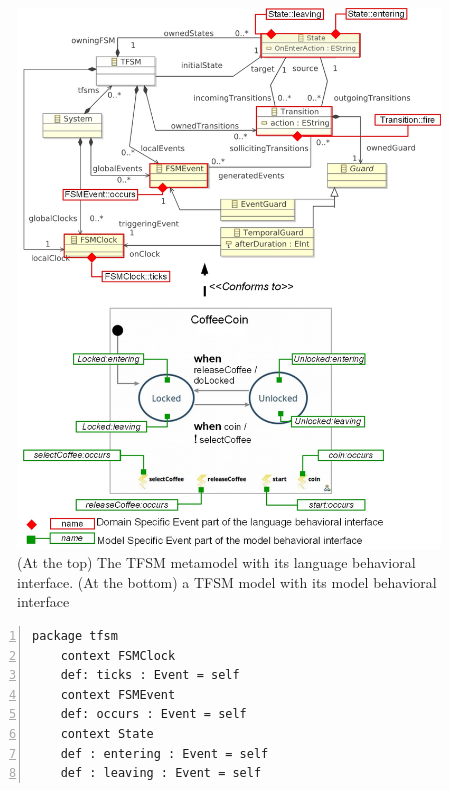 \begin{itemize}
	\begin{figure}
		\begin{center}
			\includegraphics[width=1\textwidth]{bcool/figs/tfsmmm.jpg}
			\caption{(At the top) The TFSM metamodel with its language behavioral interface. (At the bottom) a TFSM model with its model behavioral interface}
			\label{fig:tfsmmm}
		\end{center}
	\end{figure}
	
	\begin{lstlisting}[language=ecl,
	caption={Partial \ecl specification of TFSM},
	label={fig:tfsmmmecl}, 
	basicstyle=\scriptsize\ttfamily, backgroundcolor=\color{LGrey}, numbers=left, xleftmargin=3pt]
	package tfsm
	context FSMClock
	def: ticks : Event = self
	context FSMEvent
	def: occurs : Event = self
	context State
	def : entering : Event = self
	def : leaving : Event = self
	\end{lstlisting}
	

\end{itemize}
